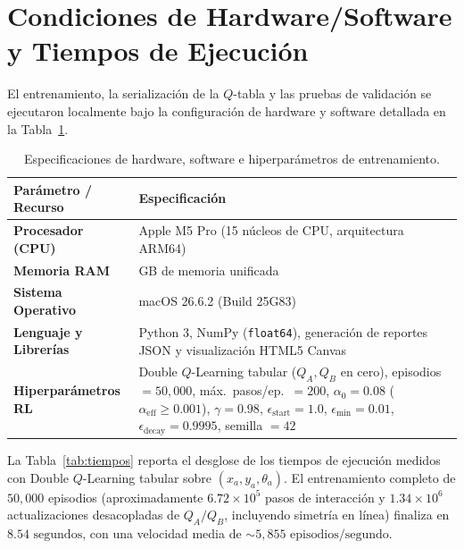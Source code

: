 \documentclass[11pt,a4paper]{article}
\begin{document}
\section{Condiciones de Hardware/Software y Tiempos de Ejecución}
El entrenamiento, la serialización de la \(Q\)-tabla y las pruebas de validación se ejecutaron localmente bajo la configuración de hardware y software detallada en la Tabla~\ref{tab:hw_sw}.

\begin{table}[h!]
\centering
\small
\renewcommand{\arraystretch}{1.18}
\caption{Especificaciones de hardware, software e hiperparámetros de entrenamiento.}
\label{tab:hw_sw}
\vspace{0.15cm}
\begin{tabularx}{\textwidth}{@{}>{\raggedright\arraybackslash}p{4.0cm} >{\raggedright\arraybackslash}X@{}}
\toprule
\textbf{Parámetro / Recurso} & \textbf{Especificación} \\ \midrule
\textbf{Procesador (CPU)} & Apple M5 Pro (15 núcleos de CPU, arquitectura ARM64) \\
\textbf{Memoria RAM} & 24 GB de memoria unificada \\
\textbf{Sistema Operativo} & macOS 26.6.2 (Build 25G83) \\
\textbf{Lenguaje y Librerías} & Python 3, NumPy (\texttt{float64}), generación de reportes JSON y visualización HTML5 Canvas \\
\textbf{Hiperparámetros RL} & Double \(Q\)-Learning tabular (\(Q_A, Q_B\) en cero), episodios \(= 50{,}000\), máx.\ pasos/ep.\ \(= 200\), \(\alpha_0 = 0.08\) (\(\alpha_{\text{eff}} \ge 0.001\)), \(\gamma = 0.98\), \(\epsilon_{\text{start}} = 1.0\), \(\epsilon_{\text{min}} = 0.01\), \(\epsilon_{\text{decay}} = 0.9995\), semilla \(= 42\) \\ \bottomrule
\end{tabularx}
\end{table}

La Tabla~\ref{tab:tiempos} reporta el desglose de los tiempos de ejecución medidos con Double \(Q\)-Learning tabular sobre \((x_a, y_a, \theta_a)\). El entrenamiento completo de \(50{,}000\) episodios (aproximadamente \(6.72 \times 10^5\) pasos de interacción y \(1.34 \times 10^6\) actualizaciones desacopladas de \(Q_A/Q_B\), incluyendo simetría en línea) finaliza en \(8.54\text{ segundos}\), con una velocidad media de \(\sim 5{,}855\text{ episodios/segundo}\).
\end{document}
